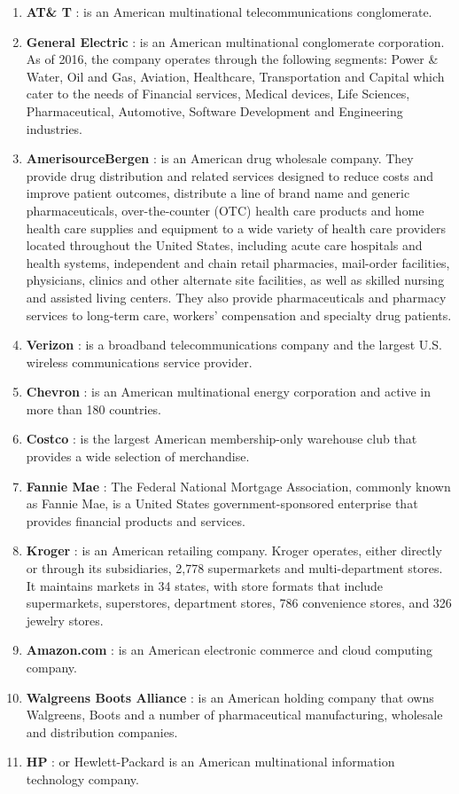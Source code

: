 \documentclass{article}
\begin{document}
\begin{enumerate}
\item \textbf{AT\& T } :  is an American multinational telecommunications conglomerate.
\item \textbf{General Electric }: is an American multinational conglomerate corporation. As of 2016, the company operates through the following segments: Power \& Water, Oil and Gas, Aviation, Healthcare, Transportation and Capital which cater to the needs of Financial services, Medical devices, Life Sciences, Pharmaceutical, Automotive, Software Development and Engineering industries.
\item \textbf{AmerisourceBergen } :  is an American drug wholesale company. They provide drug distribution and related services designed to reduce costs and improve patient outcomes, distribute a line of brand name and generic pharmaceuticals, over-the-counter (OTC) health care products and home health care supplies and equipment to a wide variety of health care providers located throughout the United States, including acute care hospitals and health systems, independent and chain retail pharmacies, mail-order facilities, physicians, clinics and other alternate site facilities, as well as skilled nursing and assisted living centers. They also provide pharmaceuticals and pharmacy services to long-term care, workers' compensation and specialty drug patients.
\item \textbf{Verizon } :  is a broadband telecommunications company and the largest U.S. wireless communications service provider.
\item \textbf{Chevron } :  is an American multinational energy corporation and active in more than 180 countries.
\item \textbf{Costco } :  is the largest American membership-only warehouse club that provides a wide selection of merchandise.
\item \textbf{Fannie Mae } : The Federal National Mortgage Association, commonly known as Fannie Mae, is a United States government-sponsored enterprise that provides financial products and services.
\item \textbf{Kroger } :  is an American retailing company. Kroger operates, either directly or through its subsidiaries, 2,778 supermarkets and multi-department stores. It maintains markets in 34 states, with store formats that include supermarkets, superstores, department stores, 786 convenience stores, and 326 jewelry stores.
\item \textbf{Amazon.com } :  is an American electronic commerce and cloud computing company.
\item \textbf{Walgreens Boots Alliance } :  is an American holding company that owns Walgreens, Boots and a number of pharmaceutical manufacturing, wholesale and distribution companies. 
\item \textbf{HP }: or Hewlett-Packard is an American multinational information technology company.
\end{enumerate}
\end{document}
